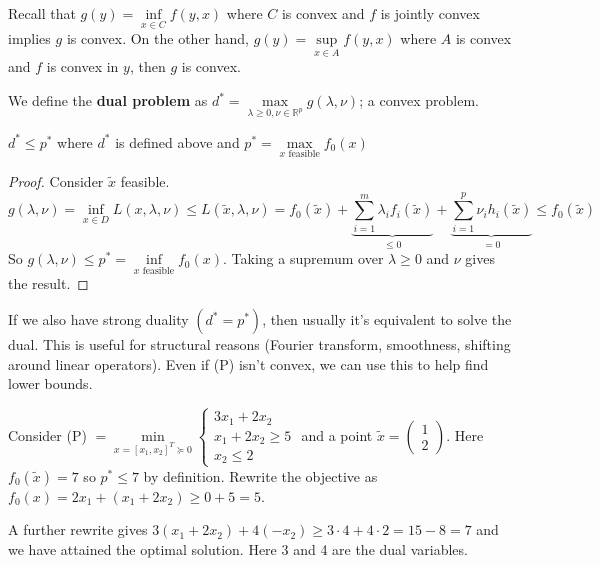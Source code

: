 \documentclass[english, 11pt]{article}
\begin{document}
 \begin{rem}
 Recall that $g(y) = \inf \limits_{x \in C} f(y,x)$ where $C$ is convex and $f$ is jointly convex implies $g$ is convex. On the other hand, $g(y) = \sup \limits_{x \in A} f(y,x)$ where $A$ is convex and $f$ is convex in $y$, then $g$ is convex.
 \end{rem}
 
 
 \begin{defn} We define the {\bf dual problem} as 
 $d^* = \max \limits_{ \lambda \ge 0, \nu \in \mathbb{R}^p} g(\lambda,\nu)$; a convex problem.
 \end{defn}
 
 \begin{thrm}
 $d^*  \le p^*$ where $d^*$ is defined above and $p^* = \max \limits_{x \text{ feasible}} f_0(x)$
 \end{thrm}
 
 \begin{proof}
 Consider $\tilde{x}$ feasible.
 \[
 g(\lambda,\nu) = \inf \limits_{x \in D} L(x,\lambda,\nu) \le L(\tilde{x},\lambda,\nu)
 = f_0(\tilde{x}) + \underbrace{\sum_{i=1}^m \lambda_i f_i(\tilde{x})}_{\le 0} + \underbrace{ \sum_{i=1}^p \nu_i h_i(\tilde{x})}_{=0}
 \le f_0(\tilde{x})
 \]
 So $g(\lambda,\nu) \le p^* = \inf \limits_{x \text{ feasible}} f_0 (x)$. Taking a supremum over $\lambda \ge 0$ and $\nu$ gives the result.
 \end{proof}
 
 \begin{rem}
 If we also have strong duality $(d^* = p^*)$, then usually it's equivalent to solve the dual. This is useful for structural reasons (Fourier transform, smoothness, shifting around linear operators). Even if (P) isn't convex, we can use this to help find lower bounds.
 \end{rem}

\begin{exmp}
Consider (P) $= \min \limits_{x = [x_1,x_2]^T \succeq 0} \begin{cases} 3x_1 + 2x_2 \\ x_1 + 2x_2 \ge 5 \\ x_2 \le 2 \end{cases}$
and a point $\tilde {x} = \begin{pmatrix} 1 \\ 2 \end{pmatrix}$. Here $f_0(\tilde{x})=7$ so $p^* \le 7 $ by definition.
Rewrite the objective as $f_0(x) = 2x_1 + (x_1 + 2x_2) \ge 0 + 5 =5$.

A further rewrite gives $3(x_1 + 2x_2) + 4(-x_2) \ge 3 \cdot 4 + 4 \cdot 2 = 15-8 =7$ and we have attained the optimal solution. Here 3 and 4 are the dual variables.
\end{exmp}
\end{document}
